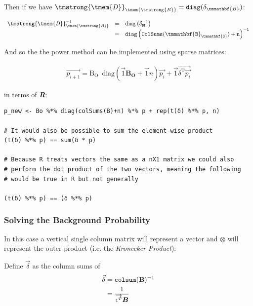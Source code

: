 \documentclass[11pt]{article}
\begin{document}
Then if we have \(\mathit{{\tmstrong{{\tmem{D}}}}}_{\mathit{{\tmem{{\tmstrong{B}}}}}} =
\mathtt{diag} (\delta_{\tmmathbf{B}}) \mathtt{}\):


\[ \begin{array}{lll}
     \mathit{{\tmstrong{{\tmem{D}}}}}_{\mathit{{\tmem{{\tmstrong{B}}}}}}^{- 1}
     & = & \mathrm{diag} \left( \delta^{- 1}_{\mathbf{B}} \right)\\
     & = & \mathtt{diag} \left( \mathtt{ColSums}
     (\mathtt{\tmmathbf{B}_{\tmmathbf{O}}}) + \mathtt{n}
     \right)^{\mathtt{- 1}}
   \end{array} \]

And so the the power method can be implemented using sparse matrices:

\begin{align}
\vec{p_{i+1}} = \mathrm{B_{O}} \enspace \mathrm{diag}\left( \vec{1} \mathbf{B_{O}} + \vec{1}n \right) \vec{p_{i}} + \vec{1} \vec{\delta^{\mathrm{T}}\vec{p_{i}}}
\end{align}

in terms of \textbf{\emph{R}}:

\lstset{language=r,label= ,caption= ,captionpos=b,numbers=none}
\begin{lstlisting}
p_new <- Bo %*% diag(colSums(B)+n) %*% p + rep(t(δ) %*% p, n)

# It would also be possible to sum the element-wise product
(t(δ) %*% p) == sum(δ * p)

# Because R treats vectors the same as a nX1 matrix we could also
# perform the dot product of the two vectors, meaning the following
# would be true in R but not generally

(t(δ) %*% p) == (δ %*% p)
\end{lstlisting}


\subsubsection{Solving the Background Probability}
\label{sec:orgd7f0ff4}
In this case a vertical single column matrix will represent a vector and \(\otimes\) will represent the outer product (i.e. the \emph{Kronecker Product}):



Define \(\vec{\delta}\) as the column sums of
\[\begin{aligned}
     \vec{\delta} & = \mathtt{colsum} (\text{{\bfseries{B}}})^{- 1}\\
     & = \frac{1}{\overrightarrow{1^{{\scriptsize \ensuremath{\boldsymbol{T}}}}}
     \ensuremath{\boldsymbol{B}}}
   \end{aligned}\]
\end{document}
